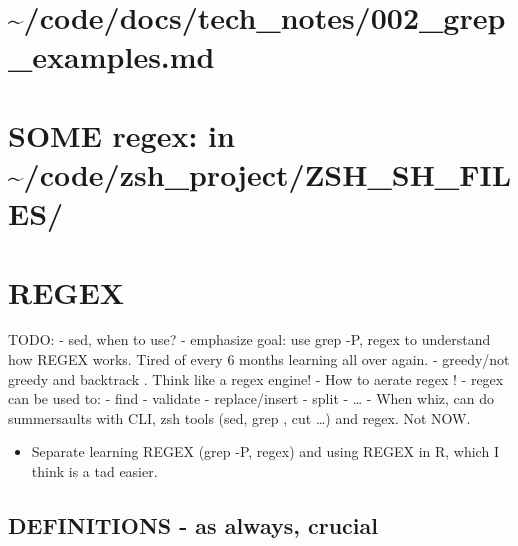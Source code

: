 \documentclass[
]{report}
\providecommand{\tightlist}{%
  \setlength{\itemsep}{0pt}\setlength{\parskip}{0pt}}\usepackage{longtable,booktabs,array}
\begin{document}
\section{\textasciitilde/code/docs/tech\_notes/002\_grep\_examples.md}\label{codedocstech_notes002_grep_examples.md}

\section{SOME regex: in
\textasciitilde/code/zsh\_project/ZSH\_SH\_FILES/}\label{some-regex-in-codezsh_projectzsh_sh_files}

\section{REGEX}\label{regex}

TODO: - sed, when to use? - emphasize goal: use grep -P, regex to
understand how REGEX works. Tired of every 6 months learning all over
again. - greedy/not greedy and backtrack . Think like a regex engine! -
How to aerate regex ! - regex can be used to: - find - validate -
replace/insert - split - \ldots{} - When whiz, can do summersaults with
CLI, zsh tools (sed, grep , cut \ldots) and regex. Not NOW.

\begin{itemize}
\tightlist
\item
  Separate learning REGEX (grep -P, regex) and using REGEX in R, which I
  think is a tad easier.
\end{itemize}

\subsection{DEFINITIONS - as always,
crucial}\label{definitions---as-always-crucial}
\end{document}
